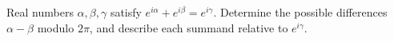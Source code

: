 Real numbers $\alpha,\beta,\gamma$ satisfy $e^{i\alpha}+e^{i\beta}=e^{i\gamma}$. Determine the possible differences $\alpha-\beta$ modulo $2\pi$, and describe each summand relative to $e^{i\gamma}$.
